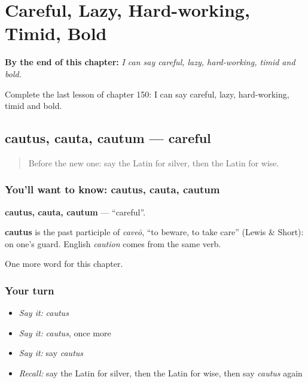 
\chapter{Careful, Lazy, Hard-working, Timid, Bold}
\label{ch:la-careful-lazy-hard-working-timid-bold}

\begin{chapteropening}
\textbf{By the end of this chapter:} \emph{I can say careful, lazy, hard-working, timid and bold.}

Complete the last lesson of chapter 150: I can say careful, lazy, hard-working, timid and bold.
\end{chapteropening}

\section[cautus, cauta, cautum]{cautus, cauta, cautum — careful}

\label{lesson:LA-C150-cautus}



\begin{quote}
Before the new one: say the Latin for silver, then the Latin for wise.
\end{quote}

\subsection*{You'll want to know: cautus, cauta, cautum}
\textbf{cautus, cauta, cautum} — \textquotedblleft{}careful\textquotedblright{}.

\begin{cousinweb}
\textbf{cautus} is the past participle of \emph{caveō}, \textquotedblleft{}to beware, to take care\textquotedblright{} (Lewis \& Short): on one's guard. English \emph{caution} comes from the same verb.
\end{cousinweb}

\begin{grammarlens}[title={What you've built}]
One more word for this chapter.
\end{grammarlens}

\subsection*{Your turn}
\begin{itemize}
\raggedright
  \item \emph{Say it:} \emph{cautus}
  \item \emph{Say it:} \emph{cautus}, once more
  \item \emph{Say it:} say \emph{cautus}
  \item \emph{Recall:} say the Latin for silver, then the Latin for wise, then say \emph{cautus} again
\end{itemize}


